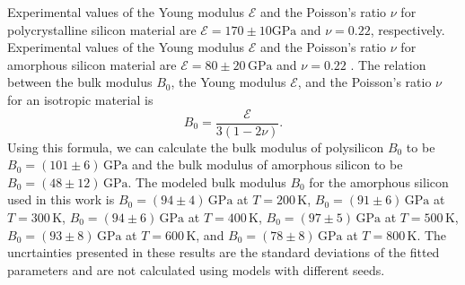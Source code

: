 Experimental values of the Young modulus $\mathcal{E}$ and the Poisson's ratio
$\nu$ for polycrystalline silicon material are $\mathcal{E} = 170 \pm 10 \mathrm{GPa}$ and
$\nu = 0.22$, respectively. Experimental values of
the Young modulus $\mathcal{E}$ and the Poisson's ratio $\nu$ for amorphous
silicon material are $\mathcal{E} = 80 \pm 20 \, \mathrm{GPa}$ and $\nu = 0.22$
\cite{Freund_Suresh_2003}. The relation between the
bulk modulus $B_0$, the Young modulus $\mathcal{E}$, and the Poisson's ratio
$\nu$ for an isotropic material is
\begin{equation}
  B_0 = \frac{\mathcal{E}}{3(1 - 2\nu)}.
\end{equation}
Using this formula, we can calculate the bulk modulus of polysilicon $B_0$ to
be $B_0 = (101 \pm 6) \, \mathrm{GPa}$ and the bulk modulus of amorphous silicon
to be $B_0 = (48 \pm 12) \, \mathrm{GPa}$. The modeled bulk modulus $B_0$ for the
amorphous silicon used in this work is
$B_0 = (94 \pm 4) \, \mathrm{GPa}$ at $T = 200 \, \mathrm{K}$,
$B_0 = (91 \pm 6) \, \mathrm{GPa}$ at $T = 300 \, \mathrm{K}$,
$B_0 = (94 \pm 6) \, \mathrm{GPa}$ at $T = 400 \, \mathrm{K}$,
$B_0 = (97 \pm 5) \, \mathrm{GPa}$ at $T = 500 \, \mathrm{K}$,
$B_0 = (93 \pm 8) \, \mathrm{GPa}$ at $T = 600 \, \mathrm{K}$,
and $B_0 = (78 \pm 8) \, \mathrm{GPa}$ at $T = 800 \, \mathrm{K}$. The
uncrtainties presented in these results are the standard deviations of the
fitted parameters and are not calculated using models with different seeds.

